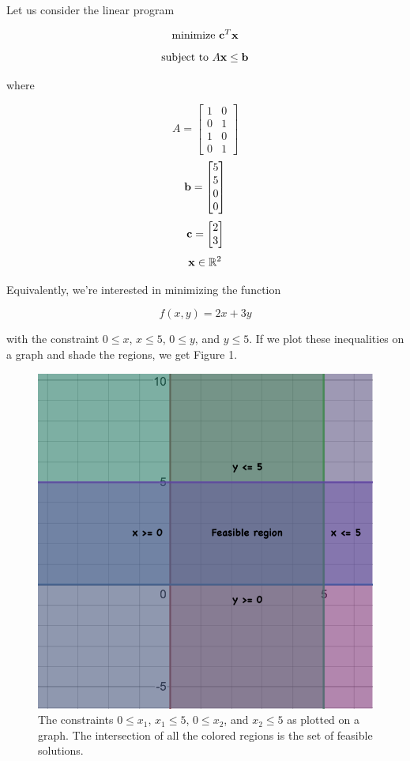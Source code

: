 \documentclass{paper}
\begin{document}
\medskip
Let us consider the linear program 

        \[ \text{minimize  } \bold{c}^T\bold{x} \]
        \[ \text{subject to  } A\bold{x} \leq \bold{b} \]
                               
where 

        \[ A = \begin{bmatrix}1 & 0 \\ 0 & 1 \\ 1 & 0 \\ 0 & 1 \end{bmatrix}\]
        \[ \bold{b} = \begin{bmatrix}5 \\ 5 \\ 0 \\ 0\end{bmatrix}\]
        \[ \bold{c} = \begin{bmatrix}2 \\ 3\end{bmatrix} \]
        \[ \bold{x} \in \mathbb{R}^2 \]

\medskip
Equivalently, we're interested in minimizing the function 

        \[ f(x, y) = 2x + 3y \]
        
with the constraint $0 \leq x$, $x \leq 5$, $0 \leq y$, and $y \leq 5$. If we plot these inequalities on a graph and shade the regions, we get Figure 1.

\begin{figure}
    \centering
    \includegraphics[scale=0.4]{figure 1.png}
    \caption{The constraints $0 \leq x_1$, $x_1 \leq 5$, $0 \leq x_2$, and $x_2 \leq 5$ as plotted on a graph. The intersection of all the colored regions is the set of feasible solutions.}
    \label{fig:my_label}
\end{figure}
\end{document}
